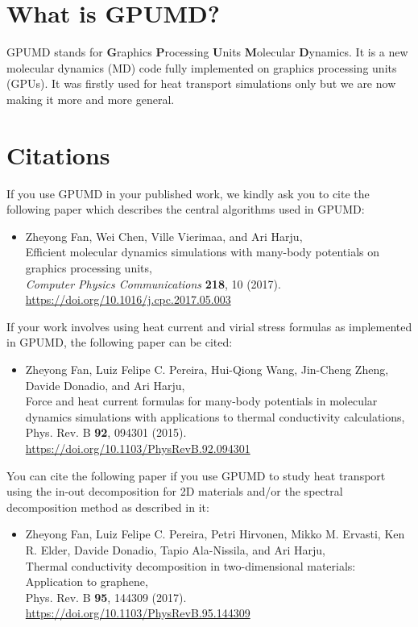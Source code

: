 \documentclass[12pt,a4paper]{report}
\begin{document}
\section{What is GPUMD?}

GPUMD stands for \textbf{G}raphics \textbf{P}rocessing \textbf{U}nits \textbf{M}olecular \textbf{D}ynamics. It is a new molecular dynamics (MD) code fully implemented on graphics processing units (GPUs). It was firstly used for heat transport simulations only but we are now making it more and more general.


\section{Citations}

If you use GPUMD in your published work, we kindly ask you to cite the following paper which describes the central algorithms used in GPUMD:

\begin{itemize}
\item Zheyong Fan, Wei Chen, Ville Vierimaa, and Ari Harju, \\
Efficient molecular dynamics simulations with many-body potentials on graphics processing units, \\
\textit{Computer Physics Communications} \textbf{218}, 10 (2017). \\
\url{https://doi.org/10.1016/j.cpc.2017.05.003}
\end{itemize}

If your work involves using heat current and virial stress formulas as implemented in GPUMD, the following paper can be cited:
\begin{itemize}
\item Zheyong Fan, Luiz Felipe C. Pereira, Hui-Qiong Wang, Jin-Cheng Zheng, Davide Donadio, and Ari Harju, \\
 Force and heat current formulas for many-body potentials in molecular dynamics simulations with applications to thermal conductivity calculations,\\
 Phys. Rev. B \textbf{92}, 094301 (2015). \\
 \url{https://doi.org/10.1103/PhysRevB.92.094301}
\end{itemize}

You can cite the following paper if you use GPUMD to study heat transport using the in-out decomposition for 2D materials and/or the spectral decomposition method as described in it:
\begin{itemize}
\item Zheyong Fan, Luiz Felipe C. Pereira, Petri Hirvonen, Mikko M. Ervasti, Ken R. Elder, Davide Donadio, Tapio Ala-Nissila, and Ari Harju, \\
Thermal conductivity decomposition in two-dimensional materials: Application to graphene, \\
Phys. Rev. B \textbf{95}, 144309 (2017). \\
\url{https://doi.org/10.1103/PhysRevB.95.144309}
\end{itemize}
\end{document}
